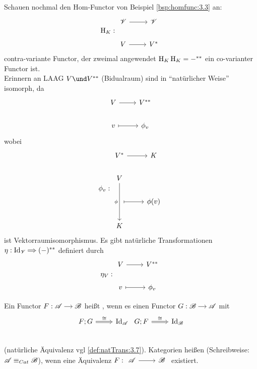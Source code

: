 \begin{beispiel}
	Schauen nochmal den Hom-Functor von Beispiel \ref{bsp:homfunc:3.3} an:
	\[
		\HFunc_{K}: 
		\begin{tikzcd}[ampersand replacement=\&]
		\V \arrow[r] \&\V \\
		V \arrow[r] \& \astar{V}
		\end{tikzcd}
	\]
	contra-variante Functor, der zweimal angewendet $\operatorname{H}_{K}\operatorname{H}_{K} = -^{\ast\ast} $ ein co-varianter Functor ist.\\
	Erinnern an LAAG $V \und \aastar{V}$ (Bidualraum) sind in ``natürlicher Weise'' isomorph, da
	\[
	\begin{tikzcd}
	 V \arrow[r] & \aastar{V}\\
	 v \arrow[r, maps to] & \phi_v
	\end{tikzcd}
	\]
	wobei 
	\begin{align*} %
		\phi_v: \begin{tikzcd}[ampersand replacement=\&]
			\astar{V} \arrow[r] \& K\\
			V \arrow[dd, "\phi"'] \& \\
			\ \arrow[r, maps to] \& \phi(v)\\
			K
		\end{tikzcd}
	\end{align*}
	ist Vektorraumisomorphismus. Es gibt natürliche Transformationen $\eta: \begin{tikzcd}[cramped, sep=small]
	\id_{\V} \arrow[r, Rightarrow] & \aastar{(-)} %
	\end{tikzcd}$ definiert durch
	\begin{align*}
		\eta_V: \begin{tikzcd}[ampersand replacement=\&]
			V \arrow[r] \& \aastar{V} \\
			v \arrow[r, maps to] \& \phi_v
		\end{tikzcd}
	\end{align*}
\end{beispiel}
\begin{definition}
	Ein Functor $F: \begin{tikzcd}[cramped, sep=small]
	\CatA \arrow[r] & \CatB
	\end{tikzcd}$ heißt , wenn es einen Functor $G: \begin{tikzcd}[cramped, sep=small]
		\CatB \arrow[r] & \CatA
	\end{tikzcd}$ mit
	\[
	\begin{tikzcd}
		F;G \arrow[r, Rightarrow, "\cong"] & \id_{\CatA}\\
	\end{tikzcd}
	\begin{tikzcd}
	G;F \arrow[r, Rightarrow, "\cong"] & \id_{\CatB}\\
	\end{tikzcd}
	\]
	(natürliche Äquivalenz vgl \ref{def:natTrans:3.7}). Kategorien heißen  (Schreibweise: $\mathscr A \equiv_{Cat} \mathscr B$), wenn eine Äquivalenz $F:
	\begin{tikzcd}
		\CatA \arrow[r] & \CatB
	\end{tikzcd}$ existiert.
\end{definition}
